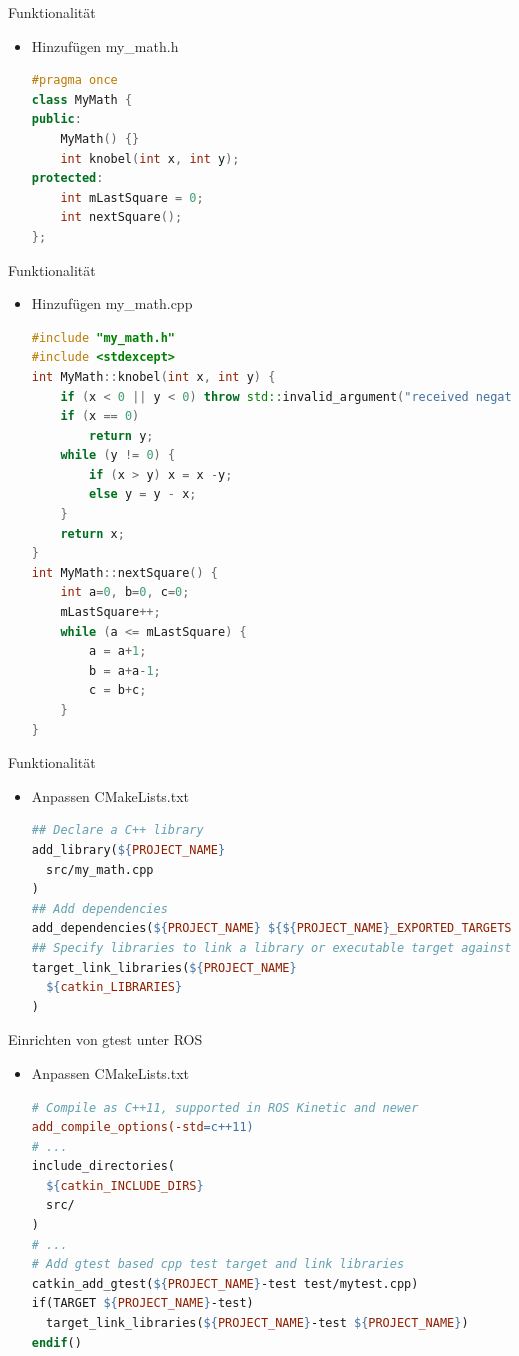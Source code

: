 \documentclass{beamer}
\begin{document}
\begin{frame}[fragile]{Funktionalität}
\begin{itemize}
\item Hinzufügen my\_math.h
\begin{lstlisting}[language=c++]
#pragma once
class MyMath {
public:
	MyMath() {}
	int knobel(int x, int y);
protected:
	int mLastSquare = 0;
	int nextSquare();
};
\end{lstlisting}
\end{itemize}
\end{frame}

\begin{frame}[fragile]{Funktionalität}
\begin{itemize}
\item Hinzufügen my\_math.cpp
\begin{lstlisting}[language=c++]
#include "my_math.h"
#include <stdexcept>
int MyMath::knobel(int x, int y) {
	if (x < 0 || y < 0) throw std::invalid_argument("received negative value");
	if (x == 0)
		return y;
	while (y != 0) {
		if (x > y) x = x -y;
		else y = y - x;
	}
	return x;
}
int MyMath::nextSquare() {
	int a=0, b=0, c=0;
	mLastSquare++;
	while (a <= mLastSquare) {
		a = a+1;
		b = a+a-1;
		c = b+c;
	}
}
\end{lstlisting}
\end{itemize}
\end{frame}

\begin{frame}[fragile]{Funktionalität}
\begin{itemize}
\item Anpassen CMakeLists.txt
\begin{lstlisting}[language=make]
## Declare a C++ library
add_library(${PROJECT_NAME}
  src/my_math.cpp
)
## Add dependencies
add_dependencies(${PROJECT_NAME} ${${PROJECT_NAME}_EXPORTED_TARGETS} ${catkin_EXPORTED_TARGETS})
## Specify libraries to link a library or executable target against
target_link_libraries(${PROJECT_NAME}
  ${catkin_LIBRARIES}
)
\end{lstlisting}
\end{itemize}
\end{frame}

\begin{frame}[fragile]{Einrichten von gtest unter ROS}
\begin{itemize}
\item Anpassen CMakeLists.txt
\begin{lstlisting}[language=make]
# Compile as C++11, supported in ROS Kinetic and newer
add_compile_options(-std=c++11)
# ...
include_directories(
  ${catkin_INCLUDE_DIRS}
  src/
)
# ...
# Add gtest based cpp test target and link libraries
catkin_add_gtest(${PROJECT_NAME}-test test/mytest.cpp)
if(TARGET ${PROJECT_NAME}-test)
  target_link_libraries(${PROJECT_NAME}-test ${PROJECT_NAME})
endif()
\end{lstlisting}
\end{itemize}
\end{frame}
\end{document}
